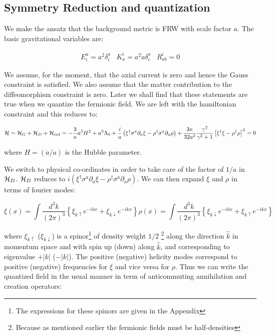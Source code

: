 \begin{doublespace}
\section{Symmetry Reduction and quantization}

We make the ansatz that the background metric is FRW with scale factor $a$. The basic gravitational
variables are:

\begin{eqnarray}\label{FRWMetricVariables}
    E_i^a = a^2\delta^a_i & K_a^i = a^2\dot{a}\delta^a_i & R_{ab}^i = 0
\end{eqnarray}

We assume, for the moment, that the axial current is zero and hence the Gauss constraint is
satisfied. We also assume that the matter contribution to the diffeomorphism constraint is zero.
Later we shall find that these statements are true when we quantize the fermionic field. We are
left with the hamiltonian constraint and this reduces to:

\begin{equation}\label{ReducedHamiltonian}
    {\cal H} = {\cal H}_G + {\cal H}_D + {\cal H}_{int}= -\frac{3}{\kappa}a^3H^2 + a^3\Lambda_0 +
    \frac{i}{a}\left(\xi^\dag\sigma^a\partial_a\xi - \rho^\dag\sigma^a\partial_a\rho\right)
    + \frac{3\kappa}{32a^3}\frac{\gamma^2}{\gamma^2+1}\left[\xi^\dag\xi - \rho^\dag\rho\right]^2 = 0
\end{equation}

where $H = (\dot{a}/a)$ is the Hubble parameter.

We switch to physical co-ordinates in order to take care of the factor of $1/a$ in ${\cal H}_D$.
${\cal H}_D$ reduces to $i(\xi^\dag\sigma^a\partial_a\xi - \rho^\dag\sigma^a\partial_a\rho)$. We
can then expand $\xi$ and $\rho$ in terms of fourier modes:

\begin{subequations}\label{FermionFourierModes}
\begin{equation}
    \xi(x) = \int \frac{d^3k}{(2\pi)^3} \left\{ \xi_{k\uparrow}e^{-ikx} + \xi_{k\downarrow}e^{-ikx} \right\}
\end{equation}
\begin{equation}
    \rho(x) = \int \frac{d^3k}{(2\pi)^3} \left\{ \xi_{k\downarrow}e^{-ikx} + \xi_{k\uparrow}e^{-ikx} \right\}
\end{equation}
\end{subequations}

where $\xi_{k\uparrow}$ ($\xi_{k\downarrow}$) is a spinor\footnote{The expressions for these
spinors are given in the Appendix} of density weight $1/2$ \footnote{Because as mentioned earlier
the fermionic fields must be half-densities} along the direction $\hat{k}$ in momentum space and
with spin up (down) along $\hat{k}$, and corresponding to eigenvalue $+|k|$ ($-|k|$). The positive
(negative) helicity modes correspond to positive (negative) frequencies for $\xi$ and vice versa
for $\rho$. Thus we can write the quantized field in the usual manner in term of anticommuting
annihilation and creation operators:


\end{doublespace}
